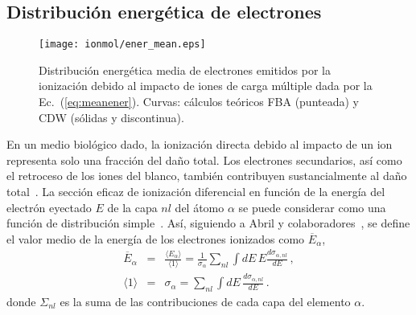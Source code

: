 \subsection{Distribución energética de electrones}
\label{subsec:meanener}

\begin{figure}
\centering
\texttt{[image: ionmol/ener\_mean.eps]}
\caption[Distribución energética media de electrones emitidos.]
{Distribución energética media de electrones emitidos por la ionización 
debido al impacto de iones de carga múltiple dada por la 
Ec.~(\ref{eq:meanener}). Curvas: cálculos teóricos FBA (punteada) y CDW 
(sólidas y discontinua).}
\label{fig:emittedener}
\end{figure} 

En un medio biológico dado, la ionización directa debido al impacto de 
un ion representa solo una fracción del daño total. Los electrones 
secundarios, así como el retroceso de los iones del blanco, también 
contribuyen sustancialmente al daño total~\cite{Denifl:11}. La sección 
eficaz de ionización diferencial en función de la energía del electrón 
eyectado $E$ de la capa $nl$ del átomo $\alpha$ se puede considerar como 
una función de distribución simple~\cite{Surdutovic:18}. Así, siguiendo 
a Abril y colaboradores~\cite{Abril:15}, se define el valor medio de la 
energía de los electrones ionizados como
$\overline{E}_{\alpha}$, 
\begin{eqnarray}
\overline{E}_{\alpha} &=&\frac{\langle E_{\alpha}\rangle}{\langle
1\rangle}=\frac{1}{\sigma_{\alpha}}\sum\limits_{nl}\int dE\,E
\frac{d\sigma_{\alpha,nl}}{dE}\,,  
\label{eq:meanener} \\
\langle 1\rangle &=&\sigma_{\alpha}=\sum\limits_{nl}\int dE\,
\frac{d\sigma_{\alpha,nl}}{dE}\,. 
\label{eq:normener}
\end{eqnarray}
donde $\Sigma_{nl}$ es la suma de las contribuciones de cada capa del 
elemento $\alpha$.

